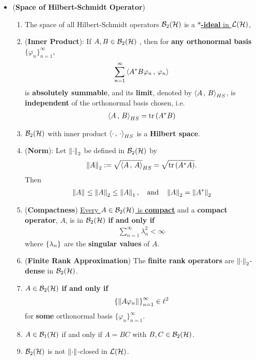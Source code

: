 \documentclass[11pt]{article}
\begin{document}
\begin{itemize}
\item \begin{proposition} (\textbf{Space of Hilbert-Schmidt Operator}) \citep{reed1980methods} 
\begin{enumerate}
\item The space of all Hilbert-Schmidt operators ${\mathcal B}_2({\mathcal H})$ is a \underline{\textbf{$*$-ideal} in ${\mathcal L}({\mathcal H})$},
\item  (\textbf{Inner Product}): If $A, B \in {\mathcal B}_2({\mathcal H})$ , then for \textbf{any orthonormal basis} $\{\varphi_n\}_{n=1}^{\infty}$, 
\begin{align*}
 \sum_{n=1}^{\infty}\left\langle A^{*}B\varphi_n\,,\, \varphi_n \right\rangle
\end{align*}
is \textbf{absolutely summable}, and its \textbf{limit}, denoted by $\left\langle A\,,\, B \right\rangle_{HS}$, is \textbf{independent} of the orthonormal basis chosen, i.e. 
\begin{align*}
\left\langle A\,,\, B \right\rangle_{HS} = \mathrm{tr}\left(A^{*}B \right)
\end{align*}
\item ${\mathcal B}_2({\mathcal H})$ with inner product  $\left\langle \cdot\,,\, \cdot \right\rangle_{HS}$ is a \textbf{Hilbert space}. 
\item (\textbf{Norm}):  Let $\left\|\cdot\right\|_{2}$ be defined in ${\mathcal B}_2({\mathcal H})$ by
\begin{align*}
\left\|A\right\|_{2} := \sqrt{\left\langle A\,,\, A \right\rangle}_{HS} = \sqrt{\mathrm{tr}\left(A^{*}A \right)}.
\end{align*} Then
\begin{align*}
\left\|A\right\|_{} \le \left\|A\right\|_{2} \le \left\|A\right\|_{1}, \quad \text{and} \quad  \left\|A\right\|_{2} =  \left\|A^{*}\right\|_{2}
\end{align*} 
\item (\textbf{Compactness}) \underline{Every $A \in {\mathcal B}_2({\mathcal H})$ is \textbf{compact}} and a \textbf{compact operator}, $A$, is in ${\mathcal B}_2({\mathcal H})$ \textbf{if and only if} 
\begin{align*}
\sum_{n=1}^{\infty}\lambda_n^2 < \infty
\end{align*} where $\left\{\lambda_n\right\}$ are the \textbf{singular values} of $A$. 
\item (\textbf{Finite Rank Approximation}) The \textbf{finite rank operators} are $\left\|\cdot\right\|_{2}$-\textbf{dense} in  ${\mathcal B}_2({\mathcal H})$. 
\item $A \in {\mathcal B}_2({\mathcal H})$ \textbf{if and only if} 
\begin{align*}
\left\{\left\|A\varphi_n\right\|_{}\right\}_{n=1}^{\infty} \in \ell^2
\end{align*}
for \textbf{some} orthonormal basis $\{\varphi_n\}_{n=1}^{\infty}$. 
\item $A \in {\mathcal B}_1({\mathcal H})$ if and only if $A = BC$ with $B, C \in {\mathcal B}_2({\mathcal H})$. 
\item  ${\mathcal B}_2({\mathcal H})$ is not $\left\|\cdot\right\|_{}$-closed in ${\mathcal L}({\mathcal H})$. 
\end{enumerate}
\end{proposition}



\end{itemize}
\end{document}
